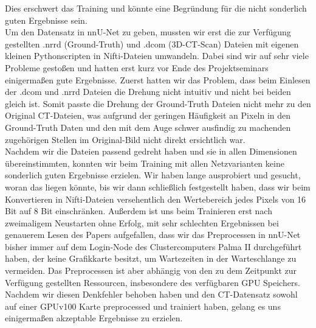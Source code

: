 Dies erschwert das Training und könnte eine Begründung für die nicht sonderlich guten Ergebnisse sein.\\
Um den Datensatz in nnU-Net zu geben, mussten wir erst die zur Verfügung gestellten .nrrd (Ground-Truth) und .dcom (3D-CT-Scan) Dateien mit eigenen kleinen Pythonscripten \cite{autoMLGithub} in Nifti-Dateien umwandeln. Dabei sind wir auf sehr viele Probleme gestoßen und hatten erst kurz vor Ende des Projektseminars einigermaßen gute Ergebnisse. Zuerst hatten wir das Problem, dass beim Einlesen der .dcom und .nrrd Dateien die Drehung nicht intuitiv und nicht bei beiden gleich ist. Somit passte die Drehung der Ground-Truth Dateien nicht mehr zu den Original CT-Dateien, was aufgrund der geringen Häufigkeit an Pixeln in den Ground-Truth Daten und den mit dem Auge schwer ausfindig zu machenden zugehörigen Stellen im Original-Bild nicht direkt ersichtlich war.\\
Nachdem wir die Dateien passend gedreht haben und sie in allen Dimensionen übereinstimmten, konnten wir beim Training mit allen Netzvarianten keine sonderlich  guten Ergebnisse erzielen. Wir haben lange ausprobiert und gesucht, woran das liegen könnte, bis wir dann schließlich festgestellt haben, dass wir beim Konvertieren in Nifti-Dateien versehentlich den Wertebereich jedes Pixels von 16 Bit auf 8 Bit einschränken. Außerdem ist uns beim Trainieren erst nach zweimaligem Neustarten ohne Erfolg, mit sehr schlechten Ergebnissen bei genauerem Lesen des Papers aufgefallen, dass wir das Preprocessen in nnU-Net bisher immer auf dem Login-Node des Clustercomputers Palma II durchgeführt haben, der keine Grafikkarte besitzt, um Wartezeiten in der Warteschlange zu vermeiden. Das Preprocessen ist aber abhängig von den zu dem Zeitpunkt zur Verfügung gestellten Ressourcen, insbesondere des verfügbaren GPU Speichers. Nachdem wir diesen Denkfehler behoben haben und den CT-Datensatz sowohl auf einer GPUv100 Karte preprocessed und trainiert haben, gelang es uns einigermaßen akzeptable Ergebnisse zu erzielen.



